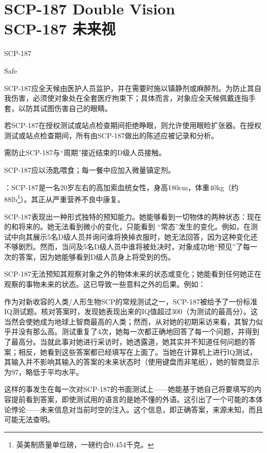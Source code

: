 \chapter[SCP-187 未来视]{
    SCP-187 Double Vision\\
    SCP-187 未来视
}

\label{chap:SCP-187}

SCP-187

Safe

SCP-187应全天候由医护人员监护，并在需要时施以镇静剂或麻醉剂。为防止其自我伤害，必须使对象处在全套医疗拘束下；具体而言，对象应全天候佩戴连指手套，以防其试图伤害自己的眼睛。

若SCP-187在授权测试或站点检查期间拒绝睁眼，则允许使用眼睑扩张器。在授权测试或站点检查期间，所有由SCP-187做出的陈述应被记录和分析。

需防止SCP-187与“周期”接近结束的D级人员接触。

SCP-187应以汤匙喂食；每一餐中应加入微量镇定剂。

：SCP-187是一名20岁左右的高加索血统女性，身高180cm，体重40kg（约88lb\footnote{英美制质量单位磅，一磅约合0.454千克。}）。其正从严重营养不良中康复。

SCP-187表现出一种形式独特的预知能力。她能够看到一切物体的两种状态：现在的和将来的。她无法看到微小的变化，只能看到 “常态”发生的变化。例如，在测试中向其展示5名D级人员并询问谁将换掉衣服时，她无法回答，因为这种变化还不够剧烈。然而，当问及5名D级人员中谁将被处决时，对象成功地“预见”了每一次的答案，因为她能够看到D级人员身上将受到的伤。

SCP-187无法预知其观察对象之外的物体未来的状态或变化；她能看到任何她正在观察的事物未来的状态。这已导致一些意料之外的后果。例如：

作为对新收容的人类\slash 人形生物SCP的常规测试之一，SCP-187被给予了一份标准IQ测试题。核对答案时，发现她表现出来的IQ值超过300（为测试的最高分）。这当然会使她成为地球上智商最高的人类；然而，从对她的初期采访来看，其智力似乎并没有那么高。测试重复了4次，她每一次都正确地回答了每一个问题，并得到了最高分。当就此事对她进行采访时，她透露道，她其实并不知道任何问题的答案；相反，她看到这些答案都已经填写在上面了。当她在计算机上进行IQ测试，其输入并不影响其输入的答案的未来状态时（使用键盘而非笔纸），她的智商显示为97，略低于平均水平。

这样的事发生在每一次对SCP-187的书面测试上——她能基于她自己将要填写的内容提前看到答案，即使测试用的语言的是她不懂的外语。这引出了一个可能的本体论悖论——未来信息对当前时空的注入。这个信息，即正确答案，来源未知，而且可能无法查明。

